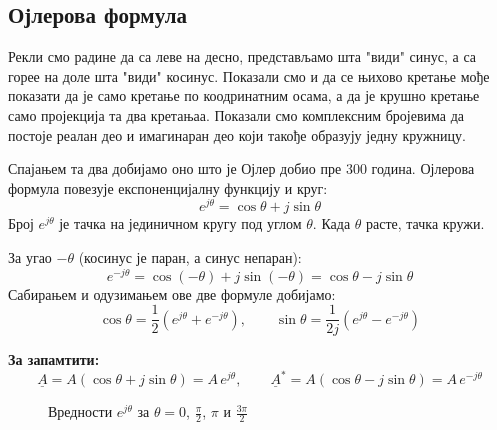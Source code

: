 \documentclass{article}
\begin{document}
\subsection{Ојлерова формула}

Рекли смо радине да са леве на десно, представљамо шта "види" синус, а са горее на доле шта "види" косинус. Показали смо и да се њихово кретање мође показати да  је само кретање по коодринатним осама, а да је крушно кретање само пројекција та два кретањаа. Показали смо комплексним бројевима да постоје реалан део и имагинаран део који такође образују једну кружницу. 

Спајањем та два добијамо оно што је Ојлер добио пре 300 година. Ојлерова формула повезује експоненцијалну функцију и круг:
\begin{equation}
    e^{j\theta} = \cos\theta + j\sin\theta
\end{equation}
Број $e^{j\theta}$ је тачка на јединичном кругу под углом $\theta$. Када $\theta$ расте, тачка кружи.

За угао $-\theta$ (косинус је паран, а синус непаран):
\[
    e^{-j\theta} = \cos(-\theta) + j\sin(-\theta) = \cos\theta - j\sin\theta
\]
Сабирањем и одузимањем ове две формуле добијамо:
\[
    \cos\theta = \frac{1}{2}\left(e^{j\theta} + e^{-j\theta}\right),
    \qquad
    \sin\theta = \frac{1}{2j}\left(e^{j\theta} - e^{-j\theta}\right)
\]

\begin{kljucno}
\textbf{За запамтити:}
\[
    \underline{A} = A(\cos\theta + j\sin\theta) = A\,e^{j\theta},
    \qquad
    \underline{A}^* = A(\cos\theta - j\sin\theta) = A\,e^{-j\theta}
\]
\end{kljucno}

\begin{figure}[H]
    \centering
    \caption{Вредности $e^{j\theta}$ за $\theta = 0$, $\frac{\pi}{2}$, $\pi$ и $\frac{3\pi}{2}$}
    \label{fig:euler-primeri}
\end{figure}
\end{document}

